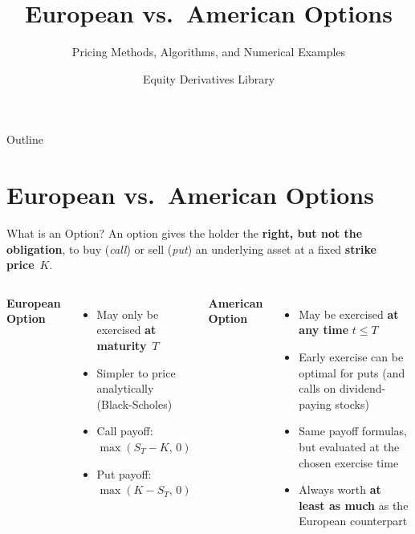 \documentclass[aspectratio=169,10pt]{beamer}
\title{European vs.\ American Options}
\subtitle{Pricing Methods, Algorithms, and Numerical Examples}
\author{Equity Derivatives Library}
\date{}
\newcommand{\highlight}[1]{\textcolor{amred}{\textbf{#1}}}
\begin{document}

\begin{frame}
  \titlepage
\end{frame}

\begin{frame}{Outline}
  \tableofcontents
\end{frame}

\section{European vs.\ American Options}

\begin{frame}{What is an Option?}
  An option gives the holder the \textbf{right, but not the obligation},
  to buy (\emph{call}) or sell (\emph{put}) an underlying asset at a fixed
  \textbf{strike price}~$K$.

  \bigskip
  \begin{columns}[T]
      \textbf{\textcolor{euroblue}{European Option}}
      \begin{itemize}
        \item May only be exercised \highlight{at maturity}~$T$
        \item Simpler to price analytically (Black-Scholes)
        \item Call payoff: $\max(S_T - K,\,0)$
        \item Put payoff: $\max(K - S_T,\,0)$
      \end{itemize}

      \textbf{\textcolor{amred}{American Option}}
      \begin{itemize}
        \item May be exercised \highlight{at any time} $t \le T$
        \item Early exercise can be optimal for puts (and calls on dividend-paying stocks)
        \item Same payoff formulas, but evaluated at the chosen exercise time
        \item Always worth \highlight{at least as much} as the European counterpart
      \end{itemize}
  \end{columns}
\end{frame}
\end{document}

